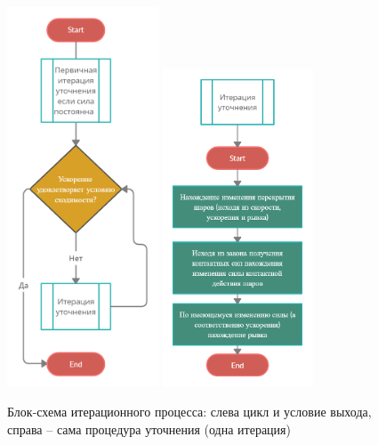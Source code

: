 \documentclass[utf8x, 14pt, oneside, a4paper]{article}
\begin{document}
\begin{figure}[H]
	\centering
	\includegraphics[width=0.4\textwidth]{iter_cicle} 
	\includegraphics[width=0.4\textwidth]{iter_one}
	\caption{Блок-схема итерационного процесса: слева цикл и условие выхода, справа -- сама процедура уточнения (одна итерация)}
	\label{pic:iter}
\end{figure} 
\end{document}

